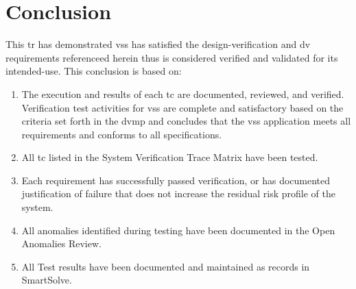 \newpage
\section{Conclusion}
This \gls{tr} has demonstrated \gls{vss} has satisfied the
\gls{design-verification} and \gls{dv} requirements referenceed
herein thus is considered verified and validated for its \gls{intended-use}.
This conclusion is based on:

\begin{enumerate} 
  \item The execution and results of each \gls{tc} are documented, reviewed, and
    verified. Verification test activities for \gls{vss} are complete and
    satisfactory based on the criteria set forth in the \gls{dvmp} and concludes
    that the \gls{vss} application meets all requirements and conforms to all
    specifications.

  \item All \gls{tc} listed in the System Verification Trace Matrix have been
    tested. 

  \item Each requirement has successfully passed verification, or has documented
    justification of failure that does not increase the residual risk profile of
    the system.

  \item All anomalies identified during testing have been documented in the Open
    Anomalies Review.

  \item All Test results have been documented and maintained as records in SmartSolve.

\end{enumerate}
